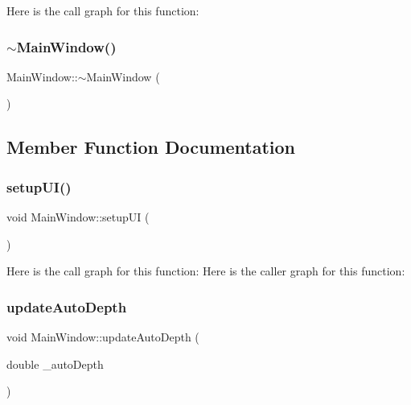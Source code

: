 Here is the call graph for this function\+:
\mbox{\label{class_main_window_ae98d00a93bc118200eeef9f9bba1dba7}} 
\subsubsection{\texorpdfstring{$\sim$\+Main\+Window()}{~MainWindow()}}
{\footnotesize\ttfamily Main\+Window\+::$\sim$\+Main\+Window (\begin{DoxyParamCaption}{ }\end{DoxyParamCaption})}



\subsection{Member Function Documentation}
\mbox{\label{class_main_window_a3a304253c9e7caeef028f75358bf1fd5}} 
\subsubsection{\texorpdfstring{setup\+U\+I()}{setupUI()}}
{\footnotesize\ttfamily void Main\+Window\+::setup\+UI (\begin{DoxyParamCaption}{ }\end{DoxyParamCaption})}

Here is the call graph for this function\+:
Here is the caller graph for this function\+:
\mbox{\label{class_main_window_acca8a0048231eaa5f025bd86030ee883}} 
\subsubsection{\texorpdfstring{update\+Auto\+Depth}{updateAutoDepth}}
{\footnotesize\ttfamily void Main\+Window\+::update\+Auto\+Depth (\begin{DoxyParamCaption}\item[{double}]{\+\_\+auto\+Depth }\end{DoxyParamCaption})\hspace{0.3cm}{\ttfamily [signal]}}

